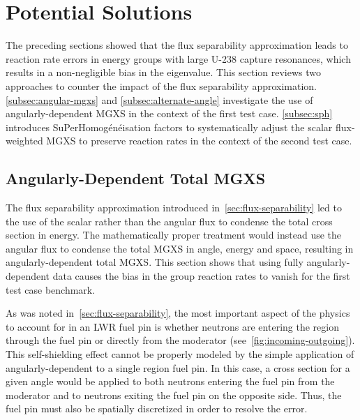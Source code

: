 \section{Potential Solutions}
\label{sec:solutions}

The preceding sections showed that the flux separability approximation leads to reaction rate errors in energy groups with large U-238 capture resonances, which results in a non-negligible bias in the eigenvalue. This section reviews two approaches to counter the impact of the flux separability approximation. \autoref{subsec:angular-mgxs} and \autoref{subsec:alternate-angle} investigate the use of angularly-dependent MGXS in the context of the first test case. \autoref{subsec:sph} introduces SuPerHomog\'{e}n\'{e}isation factors to systematically adjust the scalar flux-weighted MGXS to preserve reaction rates in the context of the second test case.


\subsection{Angularly-Dependent Total MGXS}
\label{subsec:angular-mgxs}

The flux separability approximation introduced in~\autoref{sec:flux-separability} led to the use of the scalar rather than the angular flux to condense the total cross section in energy. The mathematically proper treatment would instead use the angular flux to condense the total MGXS in angle, energy and space, resulting in angularly-dependent total MGXS. This section shows that using fully angularly-dependent data causes the bias in the group reaction rates to vanish for the first test case benchmark.

As was noted in~\autoref{sec:flux-separability}, the most important aspect of the physics to account for in an LWR fuel pin is whether neutrons are entering the region through the fuel pin or directly from the moderator (see~\autoref{fig:incoming-outgoing}). This self-shielding effect cannot be properly modeled by the simple application of angularly-dependent to a single region fuel pin. In this case, a cross section for a given angle would be applied to both neutrons entering the fuel pin from the moderator and to neutrons exiting the fuel pin on the opposite side. Thus, the fuel pin must also be spatially discretized in order to resolve the error.

